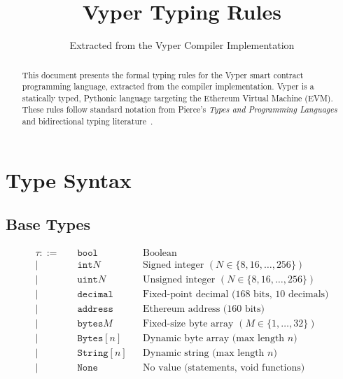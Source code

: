 \documentclass[11pt]{article}
\title{Vyper Typing Rules}
\author{Extracted from the Vyper Compiler Implementation}
\date{}
\newcommand{\kw}[1]{\texttt{#1}}
\begin{document}
\maketitle

\begin{abstract}
This document presents the formal typing rules for the Vyper smart contract programming language,
extracted from the compiler implementation. Vyper is a statically typed, Pythonic language
targeting the Ethereum Virtual Machine (EVM). These rules follow standard notation from
Pierce's \emph{Types and Programming Languages}~\cite{pierce2002types} and bidirectional
typing literature~\cite{dunfield2013complete}.
\end{abstract}

\tableofcontents
\newpage

\section{Type Syntax}

\subsection{Base Types}

\begin{align*}
\tau ::= \quad & \kw{bool} && \text{Boolean} \\
\mid \quad & \kw{int}N && \text{Signed integer } (N \in \{8,16,\ldots,256\}) \\
\mid \quad & \kw{uint}N && \text{Unsigned integer } (N \in \{8,16,\ldots,256\}) \\
\mid \quad & \kw{decimal} && \text{Fixed-point decimal (168 bits, 10 decimals)} \\
\mid \quad & \kw{address} && \text{Ethereum address (160 bits)} \\
\mid \quad & \kw{bytes}M && \text{Fixed-size byte array } (M \in \{1,\ldots,32\}) \\
\mid \quad & \kw{Bytes}[n] && \text{Dynamic byte array (max length } n \text{)} \\
\mid \quad & \kw{String}[n] && \text{Dynamic string (max length } n \text{)} \\
\mid \quad & \kw{None} && \text{No value (statements, void functions)}
\end{align*}
\end{document}
